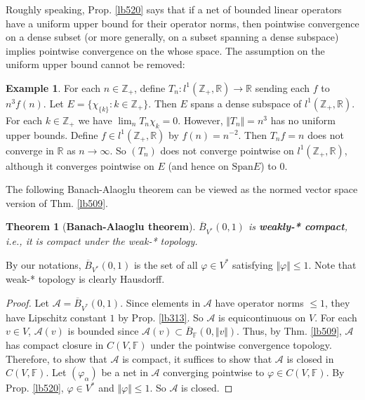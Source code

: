 \documentclass[12pt,b5paper,notitlepage]{article}
\theoremstyle{definition}
\newtheorem{eg}[df]{Example}
\theoremstyle{plain}
\newtheorem{thm}[df]{Theorem}
\newcommand{\ovl}{\overline}
\newcommand{\Span}{\mathrm{Span}}
\newcommand{\scr}{\mathscr}
\newcommand{\Zbb}{\mathbb Z}
\newcommand{\Rbb}{\mathbb R}
\newcommand{\Fbb}{\mathbb F}
\numberwithin{equation}{section}
\begin{document}
Roughly speaking, Prop. \ref{lb520} says that if a net of bounded linear operators have a uniform upper bound for their operator norms, then pointwise convergence on a dense subset (or more generally, on a subset spanning a dense subspace) implies pointwise convergence on the whose space. The assumption on the uniform upper bound cannot be removed:
\begin{eg}
For each $n\in\Zbb_+$, define $T_n:l^1(\Zbb_+,\Rbb)\rightarrow\Rbb$ sending each $f$ to $n^3f(n)$. Let $E=\{\chi_{\{k\}}:k\in\Zbb_+\}$. Then $E$ spans a dense subspace of $l^1(\Zbb_+,\Rbb)$. For each $k\in\Zbb_+$ we have $\lim_n T_n\chi_{k}=0$. However, $\Vert T_n\Vert=n^3$ has no uniform upper bounds. Define $f\in l^1(\Zbb_+,\Rbb)$ by $f(n)=n^{-2}$. Then $T_nf=n$ does not converge in $\Rbb$ as $n\rightarrow\infty$. So $(T_n)$ does not converge pointwise on $l^1(\Zbb_+,\Rbb)$, although it converges pointwise on $E$ (and hence on $\Span E$) to $0$.
\end{eg}



The following Banach-Alaoglu theorem can be viewed as the normed vector space version of Thm. \ref{lb509}.

\begin{thm}[\textbf{Banach-Alaoglu theorem}]\label{lb519}
$\ovl B_{V^*}(0,1)$ is \textbf{weakly-* compact},  i.e., it is compact under the weak-* topology. 
\end{thm}

By our notations, $\ovl B_{V^*}(0,1)$ is the set of all $\varphi\in V^*$ satisfying $\Vert\varphi\Vert\leq 1$. Note that weak-* topology is clearly Hausdorff.

\begin{proof}
Let $\scr A=\ovl B_{V^*}(0,1)$. Since elements in $\scr A$ have operator norms $\leq 1$, they have Lipschitz constant $1$ by Prop. \ref{lb313}. So $\scr A$ is equicontinuous on $V$. For each $v\in V$, $\scr A(v)$ is bounded since $\scr A(v)\subset\ovl B_\Fbb(0,\Vert v\Vert)$. Thus, by Thm. \ref{lb509}, $\scr A$ has compact closure in $C(V,\Fbb)$ under the pointwise convergence topology. Therefore, to show that $\scr A$ is compact, it suffices to show that $\scr A$ is closed in $C(V,\Fbb)$. Let $(\varphi_\alpha)$ be a net in $\scr A$ converging pointwise to $\varphi\in C(V,\Fbb)$. By Prop. \ref{lb520}, $\varphi\in V^*$ and $\Vert\varphi\Vert\leq 1$. So $\scr A$ is closed.
\end{proof}
\end{document}

